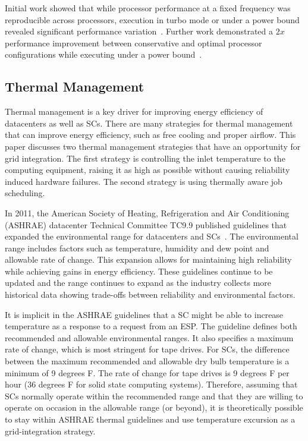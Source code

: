 Initial work showed that while processor performance at a fixed frequency 
was reproducible across processors, execution in turbo mode or under a power
bound revealed significant performance variation~\cite{Rountree2012}. Further
work demonstrated a $2x$ performance improvement between conservative and
optimal processor configurations while executing under a power bound~\cite{Patki1}.

\subsection{Thermal Management}

Thermal management is a key driver for improving energy efficiency of datacenters as well as SCs. There are many strategies for thermal
management that can improve energy efficiency, such as free cooling and proper
airflow. This paper discusses two thermal management strategies that have an
opportunity for grid integration. The first strategy is controlling the inlet
temperature to the computing equipment, raising it as high as possible without
causing reliability induced hardware failures. The second strategy is using
thermally aware job scheduling.

In 2011, the American Society of Heating, Refrigeration and Air Conditioning
(ASHRAE) datacenter Technical Committee TC9.9 published guidelines that
expanded the environmental range for datacenters and SCs~\cite{ASHRAE:tgfdpe}. The environmental range includes factors such as temperature, humidity
and dew point and allowable rate of change. This expansion allows for
maintaining high reliability while achieving gains in energy efficiency. These
guidelines continue to be updated and the range continues to expand as the
industry collects more historical data showing trade-offs between reliability
and environmental factors.

It is implicit in the ASHRAE guidelines that a SC might be
able to increase temperature as a response to a request from an ESP. The guideline defines both recommended and
allowable environmental ranges. It also specifies a maximum rate of
change, which is most stringent for tape drives. For SCs, the
difference between the maximum recommended and allowable dry bulb temperature is
a minimum of 9 degrees F. The rate of change for tape drives is 9 degrees F per
hour (36 degrees F for solid state computing systems). Therefore, assuming
that SCs normally operate within the recommended range and
that they are willing to operate on occasion in the allowable range (or beyond),
it is theoretically possible to stay within ASHRAE thermal guidelines and use
temperature excursion as a grid-integration strategy. 

